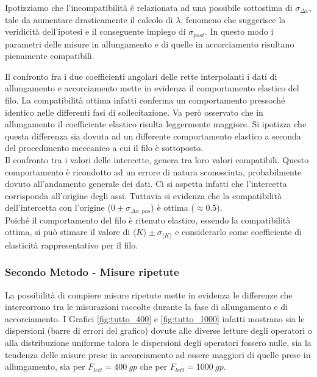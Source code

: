 \documentclass[a4paper,11pt,oneside]{article}
\begin{document}
Ipotizziamo che l'incompatibilità è relazionata ad una possibile sottostima di $\sigma_{\Delta x}$, tale da aumentare drasticamente il calcolo di $\lambda$, fenomeno che suggerisce la veridicità dell'ipotesi e il conseguente impiego di $\sigma_{post}$. In questo modo i parametri delle misure in allungamento e di quelle in accorciamento risultano pienamente compatibili.

Il confronto fra i due coefficienti angolari delle rette interpolanti i dati di allungamento e accorciamento mette in evidenza il comportamento elastico del filo. La compatibilità ottima infatti conferma un comportamento pressoché identico nelle differenti fasi di sollecitazione. Va però osservato che in allungamento il coefficiente elastico risulta leggermente maggiore. Si ipotizza che questa differenza sia dovuta ad un differente comportamento elastico a seconda del procedimento meccanico a cui il filo è sottoposto.\\

Il confronto tra i valori delle intercette, genera tra loro valori compatibili. Questo comportamento è ricondotto ad un errore di natura sconosciuta, probabilmente dovuto all'andamento generale dei dati. Ci si aspetta infatti che l'intercetta corrisponda all'origine degli assi. Tuttavia si evidenza che la compatibilità dell'intercetta con l'origine ($0\pm \sigma_{\Delta x, pos}$) è ottima ($\approx \num{0.5}$).\\

Poiché il comportamento del filo è ritenuto elastico, essendo la compatibilità ottima, si può stimare il valore di $\langle K \rangle \pm \sigma_{\langle K \rangle}$ e considerarlo come coefficiente di elasticità rappresentativo per il filo.\\


\subsubsection*{Secondo Metodo - Misure ripetute}
\begin{figure}[h!]
    \centering
\end{figure}

La possibilità di compiere misure ripetute mette in evidenza le differenze che intercorrono tra le misurazioni raccolte durante la fase di allungamento e di accorciamento. I Grafici \ref{fig:tutto_400} e \ref{fig:tutto_1000} infatti mostrano sia le dispersioni (barre di errori del grafico) dovute alle diverse letture degli operatori o alla distribuzione uniforme talora le dispersioni degli operatori fossero nulle, sia la tendenza delle misure prese in accorciamento ad essere maggiori di quelle prese in allungamento, sia per $F_{lett}=\SI{400}{gp}$ che per $F_{lett}=\SI{1000}{gp}$.
\end{document}
